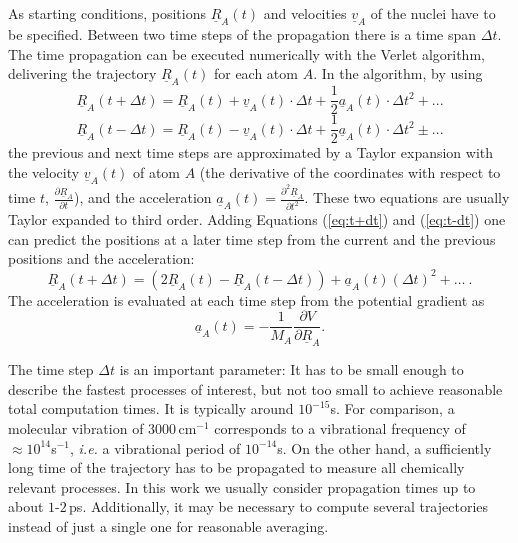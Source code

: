 \documentclass[11pt,DIV=13,BCOR=5mm,a4paper,headinclude]{scrbook}
\renewcommand{\vec}[1]{\underline{#1}}
\begin{document}
As starting conditions, positions $\vec{R}_A(t)$ and velocities $\vec{v}_A$ of the nuclei have to be specified.
Between two time steps of the propagation there is a time span $\Delta t$.
The time propagation can be executed numerically with the Verlet algorithm\cite{verlet}, delivering the trajectory $\vec{R}_A(t)$ for each atom $A$.
In the algorithm, by using
\begin{equation}\label{eq:t+dt}
 \vec{R}_A(t+\Delta t) = \vec{R}_A(t) + \vec{v}_A(t)\cdot \Delta t + \frac{1}{2}\vec{a}_A(t)\cdot \Delta t^2 + ...
 \end{equation}
 \begin{equation}\label{eq:t-dt}
 \vec{R}_A(t-\Delta t) = \vec{R}_A(t) - \vec{v}_A(t)\cdot \Delta t + \frac{1}{2}\vec{a}_A(t)\cdot \Delta t^2 \pm ...
\end{equation}
the previous and next time steps are approximated by a Taylor expansion with the velocity $\vec{v}_A(t)$ of atom $A$ (the derivative of the coordinates with respect to time $t$, $\frac{\partial \vec{R}_A}{\partial t}$), and the acceleration $\vec{a}_A(t)=\frac{\partial^2 \vec{R}_A}{\partial t^2}$.
These two equations are usually Taylor expanded to third order.
Adding Equations (\ref{eq:t+dt}) and (\ref{eq:t-dt}) one can predict the positions at a later time step from the current and the previous positions and the acceleration:
\begin{equation}
 \vec{R}_A(t+\Delta t)=(2\vec{R}_A(t) - \vec{R}_A(t-\Delta t)) + \vec{a}_A(t)(\Delta t)^2 + \ldots ~.
\end{equation}
The acceleration is evaluated at each time step from the potential gradient as
\begin{equation}
 \vec{a}_A(t)=-\frac{1}{M_A}\frac{\partial V}{\partial\vec{R}_A}.
\end{equation}


The time step $\Delta t$ is an important parameter: It has to be small enough to describe the fastest processes of interest, but not too small to achieve reasonable total computation times.
It is typically around $10^{-15}$s.
For comparison, a molecular vibration of $3000\,$cm$^{-1}$ corresponds to a vibrational frequency of $\approx 10^{14}$s$^{-1}$, \textit{i.e.} a vibrational period of $10^{-14}$s.
On the other hand, a sufficiently long time of the trajectory has to be propagated to measure all chemically relevant processes.
In this work we usually consider propagation times up to about $1$-$2\,$ps.
Additionally, it may be necessary to compute several trajectories instead of just a single one for reasonable averaging.
\end{document}
